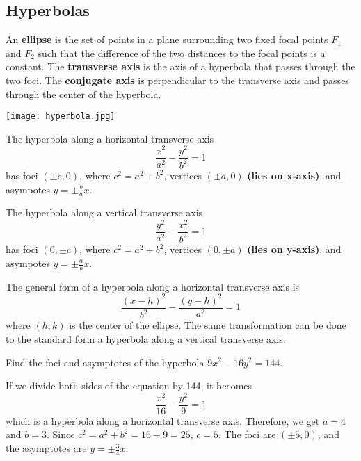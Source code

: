   \subsection*{Hyperbolas}
    An \textbf{ellipse} is the set of points in a plane surrounding two fixed focal points $F_1$ and $F_2$ such that the \underline{difference} of the two distances to the focal points is a constant. The \textbf{transverse axis} is the axis of a hyperbola that passes through the two foci. The \textbf{conjugate axis} is perpendicular to the transverse axis and passes through the center of the hyperbola.
    \begin{center}
      \texttt{[image: hyperbola.jpg]}
    \end{center}
    \begin{definition}
      The hyperbola along a horizontal transverse axis
      $$\frac{x^2}{a^2}-\frac{y^2}{b^2}=1$$
      has foci $(\pm c,0)$, where $c^2=a^2 + b^2$, vertices $(\pm a,0)$ \textbf{(lies on x-axis)}, and asympotes $y=\pm\frac{b}{a}x$.
    \end{definition}
    \begin{definition}
      The hyperbola along a vertical transverse axis
      $$\frac{y^2}{a^2}-\frac{x^2}{b^2}=1$$
      has foci $(0, \pm c)$, where $c^2=a^2 + b^2$, vertices $(0, \pm a)$ \textbf{(lies on y-axis)}, and asympotes $y=\pm\frac{a}{b}x$.
    \end{definition}
     \begin{definition}
      The general form of a hyperbola along a horizontal transverse axis is
      $$\frac{(x-h)^2}{b^2}-\frac{(y-h)^2}{a^2}=1$$
      where $(h,k)$ is the center of the ellipse. The same transformation can be done to the standard form a hyperbola along a vertical transverse axis.
    \end{definition}
    \begin{example}
      Find the foci and asymptotes of the hyperbola ${9x^2 - 16y^2 = 144}$.
    \end{example}
    \begin{solution}
      If we divide both sides of the equation by 144, it becomes $$\frac{x^2}{16}-\frac{y^2}{9}=1$$
      which is a hyperbola along a horizontal transverse axis. Therefore, we get $a=4$ and $b=3$. Since $c^2=a^2 + b^2 = 16+9=25$, $c=5$. The foci are $(\pm 5,0)$, and the asymptotes are $y=\pm\frac{3}{4}x$.
    \end{solution}